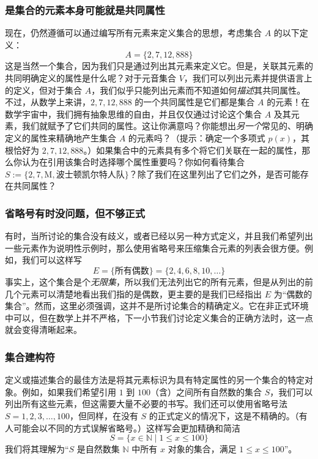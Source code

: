 \subsubsection*{是集合的元素本身可能就是共同属性}

现在，仍然遵循可以通过编写所有元素来定义集合的思想，考虑集合 $A$ 的以下定义：
\[A=\{2, 7, 12, 888\}\]
这是当然一个集合，因为我们只是通过列出其元素来定义它。但是，关联其元素的共同明确定义的属性是什么呢？对于元音集合 $V$，我们可以列出元素并提供语言上的定义，但对于集合 $A$，我们似乎只能列出元素而不知道如何\emph{描述}其共同属性。不过，从数学上来讲，$2,7,12,888$ 的一个共同属性是它们都是集合 $A$ 的元素！在数学宇宙中，我们拥有抽象思维的自由，并且仅仅通过讨论这个集合 $A$ 及其元素，我们就赋予了它们共同的属性。这让你满意吗？你能想出\emph{另一个}常见的、明确定义的属性来精确地产生集合 $A$ 的元素吗？（提示：确定一个多项式 $p(x)$，其根恰好为 $2,7, 12, 888$。）如果集合中的元素具有多个将它们关联在一起的属性，那么你认为在引用该集合时选择哪个属性重要吗？你如何看待集合 $S := \{2, 7, \text{M}, \text{波士顿凯尔特人队}\}$？除了我们在这里列出了它们之外，是否可能存在共同属性？

\subsubsection*{省略号有时没问题，但不够正式}

有时，当所讨论的集合没有歧义，或者已经以另一种方式定义，并且我们希望列出一些元素作为说明性示例时，那么使用省略号来压缩集合元素的列表会很方便。例如，我们可以这样写
\[E = \{\text{所有偶数}\} = \{2, 4, 6, 8, 10, \dots\}\]
事实上，这个集合是个\emph{无限集}，所以我们无法列出它的所有元素，但是从列出的前几个元素可以清楚地看出我们指的是偶数，更主要的是我们已经指出 $E$ 为``偶数的集合''。然而，这里必须强调，这并不是所讨论集合的精确定义。它在非正式环境中可以，但在数学上并不严格，下一小节我们讨论定义集合的正确方法时，这一点就会变得清晰起来。

\subsubsection*{集合建构符}

定义或描述集合的最佳方法是将其元素标识为具有特定属性的另一个集合的特定对象。例如，如果我们希望引用 $1$ 到 $100$（含）之间所有自然数的集合 $S$，我们可以列出所有这些元素，但这需要大量不必要的书写。我们还可以使用省略号法 $S = {1, 2, 3, \dots , 100}$，但同样，在没有 $S$ 的正式定义的情况下，这是不精确的。（有人可能会以不同的方式误解省略号。）这样写会更加精确和简洁
\[S = \{x \in \mathbb{N} \mid 1 \le x \le 100\}\]
我们将其理解为``$S$ 是自然数集 $\mathbb{N}$ 中所有 $x$ 对象的集合，满足 $1 \le x \le 100$''。

